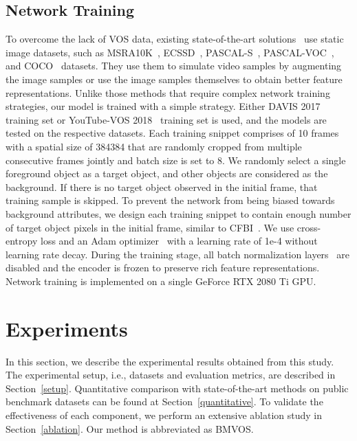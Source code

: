 \documentclass[10pt,twocolumn,letterpaper]{article}
\begin{document}
	\subsection{Network Training}
	\label{network training}
	To overcome the lack of VOS data, existing state-of-the-art solutions~\cite{STM, KMN, CFBI, RMNet} use static image datasets, such as MSRA10K~\cite{MSRA10K}, ECSSD~\cite{ECSSD}, PASCAL-S~\cite{PASCAL-S}, PASCAL-VOC~\cite{PASCAL-VOC}, and COCO~\cite{COCO} datasets. They use them to simulate video samples by augmenting the image samples or use the image samples themselves to obtain better feature representations. Unlike those methods that require complex network training strategies, our model is trained with a simple strategy. Either DAVIS 2017~\cite{DAVIS2017} training set or YouTube-VOS 2018~\cite{YTVOS} training set is used, and the models are tested on the respective datasets. Each training snippet comprises of 10 frames with a spatial size of 384384 that are randomly cropped from multiple consecutive frames jointly and batch size is set to 8. We randomly select a single foreground object as a target object, and other objects are considered as the background. If there is no target object observed in the initial frame, that training sample is skipped. To prevent the network from being biased towards background attributes, we design each training snippet to contain enough number of target object pixels in the initial frame, similar to CFBI~\cite{CFBI}. We use cross-entropy loss and an Adam optimizer~\cite{adam} with a learning rate of 1e-4 without learning rate decay. During the training stage, all batch normalization layers~\cite{batchnorm} are disabled and the encoder is frozen to preserve rich feature representations. Network training is implemented on a single GeForce RTX 2080 Ti GPU. 
	
	
	\section{Experiments}
	In this section, we describe the experimental results obtained from this study. The experimental setup, i.e., datasets and evaluation metrics, are described in Section~\ref{setup}.  Quantitative comparison with state-of-the-art methods on public benchmark datasets can be found at Section~\ref{quantitative}. To validate the effectiveness of each component, we perform an extensive ablation study in Section~\ref{ablation}. Our method is abbreviated as BMVOS.
	
	
	
\end{document}

